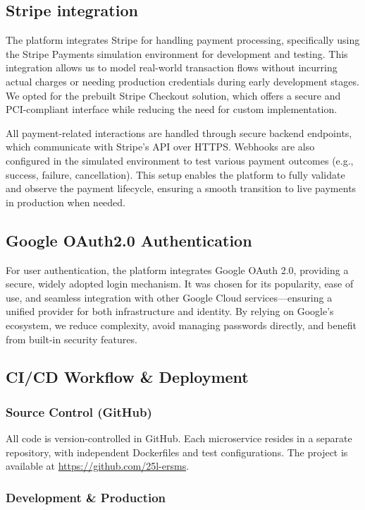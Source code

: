 \documentclass[11pt,a4paper]{article}
\begin{document}
\subsection{Stripe integration}

The platform integrates Stripe for handling payment processing, specifically using the Stripe Payments simulation environment for development and testing. This integration allows us to model real-world transaction flows without incurring actual charges or needing production credentials during early development stages. We opted for the prebuilt Stripe Checkout solution, which offers a secure and PCI-compliant interface while reducing the need for custom implementation.

All payment-related interactions are handled through secure backend endpoints, which communicate with Stripe’s API over HTTPS. Webhooks are also configured in the simulated environment to test various payment outcomes (e.g., success, failure, cancellation). This setup enables the platform to fully validate and observe the payment lifecycle, ensuring a smooth transition to live payments in production when needed.

\subsection{Google OAuth2.0 Authentication}

For user authentication, the platform integrates Google OAuth 2.0, providing a secure, widely adopted login mechanism. It was chosen for its popularity, ease of use, and seamless integration with other Google Cloud services—ensuring a unified provider for both infrastructure and identity. By relying on Google’s ecosystem, we reduce complexity, avoid managing passwords directly, and benefit from built-in security features. 

\subsection{CI/CD Workflow \& Deployment}
\subsubsection{Source Control (GitHub)}
All code is version-controlled in GitHub. Each microservice resides
in a separate repository, with independent Dockerfiles and test configurations.
The project is available at \url{https://github.com/25l-ersms}.

\subsubsection{Development \& Production}
\end{document}
